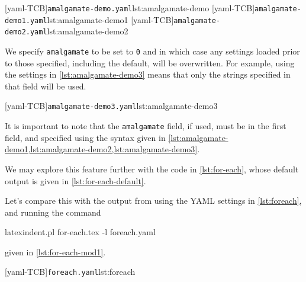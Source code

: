  \begin{cmhtcbraster}[raster columns=3,
   raster left skip=-3.5cm,
   raster right skip=-2cm,
   raster column skip=.03\linewidth]
  [yaml-TCB]{\texttt{amalgamate-demo.yaml}}{lst:amalgamate-demo}
  [yaml-TCB]{\texttt{amalgamate-demo1.yaml}}{lst:amalgamate-demo1}
  [yaml-TCB]{\texttt{amalgamate-demo2.yaml}}{lst:amalgamate-demo2}
 \end{cmhtcbraster}

 We specify \texttt{amalgamate} to be set to \texttt{0} and in which case any settings
 loaded prior to those specified, including the default, will be overwritten. For example,
 using the settings in \cref{lst:amalgamate-demo3} means that only the strings specified
 in that field will be used.

 [yaml-TCB]{\texttt{amalgamate-demo3.yaml}}{lst:amalgamate-demo3}

 It is important to note that the \texttt{amalgamate} field, if used, must be in the first
 field, and specified using the syntax given in
 \cref{lst:amalgamate-demo1,lst:amalgamate-demo2,lst:amalgamate-demo3}.

 We may explore this feature further with the code in \cref{lst:for-each}, whose default
 output is given in \cref{lst:for-each-default}.

 \begin{cmhtcbraster}[raster column skip=.1\linewidth]
 \end{cmhtcbraster}

 Let's compare this with the output from using the YAML settings in \cref{lst:foreach},
 and running the command 
 \begin{commandshell}
latexindent.pl for-each.tex -l foreach.yaml  
\end{commandshell}
 given in \cref{lst:for-each-mod1}.

 \begin{cmhtcbraster}[raster column skip=.1\linewidth]
  [yaml-TCB]{\texttt{foreach.yaml}}{lst:foreach}
 \end{cmhtcbraster}

